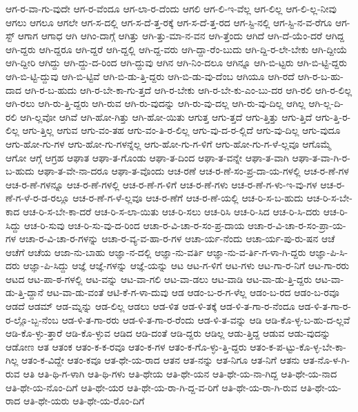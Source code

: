 {ಆಗ-ರ-ವಾ-ಗು-ವುದೇ
ಆಗ-ರ-ವೆಂದೂ
ಆಗ-ಲಾ-ರ-ದೆಂದು
ಆಗಲಿ
ಆಗ-ಲಿ-ಇ-ವೆಲ್ಲ
ಆಗ-ಲಿಲ್ಲ
ಆಗ-ಲಿ-ಲ್ಲ-ನೀವು
ಆಗಲು
ಆಗಲೂ
ಆಗಲೇ
ಆಗ-ಸ-ದಲ್ಲಿ
ಆಗ-ಸ-ದೆ-ತ್ತ-ರಕ್ಕೆ
ಆಗ-ಸ-ದೆ-ತ್ತ-ರದ
ಆಗ-ಸ್ಟಿ-ನಲ್ಲಿ
ಆಗ-ಸ್ಟಿ-ನ-ವ-ರೆಗೂ
ಆಗ-ಸ್ಟ್
ಆಗಾಗ
ಆಗಾಧ
ಆಗಿ
ಆಗಿಂ-ದಾಗ್ಗೆ
ಆಗಿತ್ತು
ಆಗಿ-ತ್ತು-ಮಾ-ನ-ವನ
ಆಗಿ-ತ್ತೆಂದು
ಆಗಿದೆ
ಆಗಿ-ದೆ-ಯೆಂ-ದರೆ
ಆಗಿದ್ದ
ಆಗಿ-ದ್ದರು
ಆಗಿ-ದ್ದರೂ
ಆಗಿ-ದ್ದರೆ
ಆಗಿ-ದ್ದಲ್ಲಿ
ಆಗಿ-ದ್ದ-ವರು
ಆಗಿ-ದ್ದಾ-ರೆಂ-ಬುದು
ಆಗಿ-ದ್ದಿ-ರ-ಲೇ-ಬೇಕು
ಆಗಿ-ದ್ದೀಯೆ
ಆಗಿ-ದ್ದೀರಿ
ಆಗಿದ್ದು
ಆಗಿ-ದ್ದು-ದ-ರಿಂದ
ಆಗಿ-ದ್ದುವು
ಆಗಿನ
ಆಗಿ-ನಿಂ-ದಲೂ
ಆಗಿನ್ನೂ
ಆಗಿ-ಬಿ-ಟ್ಟರು
ಆಗಿ-ಬಿ-ಟ್ಟಿ-ದ್ದರು
ಆಗಿ-ಬಿ-ಟ್ಟಿ-ದ್ದುವು
ಆಗಿ-ಬಿ-ಟ್ಟಿವೆ
ಆಗಿ-ಬಿ-ಡು-ತ್ತಿ-ದ್ದರು
ಆಗಿ-ಬಿ-ಡು-ವು-ದೆಂಬ
ಆಗಿಯೂ
ಆಗಿ-ರದೆ
ಆಗಿ-ರ-ಬ-ಹು-ದಾದ
ಆಗಿ-ರ-ಬ-ಹುದು
ಆಗಿ-ರ-ಬೇ-ಕಾ-ಗು-ತ್ತದೆ
ಆಗಿ-ರ-ಬೇಕು
ಆಗಿ-ರ-ಬೇ-ಕು-ಎಂ-ಬು-ದರ
ಆಗಿ-ರಲಿ
ಆಗಿ-ರ-ಲಿಲ್ಲ
ಆಗಿ-ರಲು
ಆಗಿ-ರು-ತ್ತಿ-ದ್ದರು
ಆಗಿ-ರುವ
ಆಗಿ-ರು-ವುದನ್ನು
ಆಗಿ-ರು-ವು-ದಲ್ಲ
ಆಗಿ-ರು-ವು-ದಿಲ್ಲ
ಆಗಿಲ್ಲ
ಆಗಿ-ಲ್ಲ-ದಿ-ರಲಿ
ಆಗಿ-ಲ್ಲವೋ
ಆಗಿವೆ
ಆಗಿ-ಹೋ-ಗಿತ್ತು
ಆಗಿ-ಹೋ-ಯಿತು
ಆಗುತ್ತ
ಆಗು-ತ್ತದೆ
ಆಗು-ತ್ತಿತ್ತು
ಆಗು-ತ್ತಿದೆ
ಆಗು-ತ್ತಿ-ರ-ಲಿಲ್ಲ
ಆಗು-ತ್ತಿಲ್ಲ
ಆಗುವ
ಆಗು-ವಂ-ತಹ
ಆಗು-ವಂ-ತಿ-ರ-ಲಿಲ್ಲ
ಆಗು-ವು-ದ-ರ-ಲ್ಲಿದೆ
ಆಗು-ವು-ದಿಲ್ಲ
ಆಗು-ವುದೂ
ಆಗು-ಹೋ-ಗು-ಗಳ
ಆಗು-ಹೋ-ಗು-ಗಳನ್ನೆಲ್ಲ
ಆಗು-ಹೋ-ಗು-ಗ-ಳಿಗೆ
ಆಗು-ಹೋ-ಗು-ಗ-ಳೆ-ಲ್ಲವೂ
ಆಗೊಮ್ಮೆ
ಆಗೋ
ಆಗ್ಗೆ
ಆಗ್ರಹ
ಆಘಾತ
ಆಘಾ-ತ-ಗೊಂಡು
ಆಘಾ-ತ-ದಿಂದ
ಆಘಾ-ತ-ವನ್ನೇ
ಆಘಾ-ತ-ವಾಗಿ
ಆಘಾ-ತ-ವಾ-ಗಿ-ರ-ಬ-ಹುದು
ಆಘಾ-ತ-ವೇ-ನಾ-ದರೂ
ಆಘಾ-ತ-ವೊಂದು
ಆಚ-ರಣೆ
ಆಚ-ರ-ಣೆ-ಸಂ-ಪ್ರ-ದಾ-ಯ-ಗಳಲ್ಲಿ
ಆಚ-ರ-ಣೆ-ಗಳ
ಆಚ-ರ-ಣೆ-ಗಳನ್ನೂ
ಆಚ-ರ-ಣೆ-ಗಳಲ್ಲಿ
ಆಚ-ರ-ಣೆ-ಗ-ಳಿಗೆ
ಆಚ-ರ-ಣೆ-ಗಳು
ಆಚ-ರ-ಣೆ-ಗ-ಳು-ಇ-ವು-ಗಳ
ಆಚ-ರ-ಣೆ-ಗ-ಳೆ-ರ-ಡ-ರಲ್ಲೂ
ಆಚ-ರ-ಣೆ-ಗ-ಳೆ-ಲ್ಲವೂ
ಆಚ-ರ-ಣೆಗೆ
ಆಚ-ರ-ಣೆ-ಯಲ್ಲಿ
ಆಚ-ರಿ-ಸ-ಬ-ಹುದು
ಆಚ-ರಿ-ಸ-ಬೇ-ಕಾದ
ಆಚ-ರಿ-ಸ-ಬೇ-ಕಾ-ದರೆ
ಆಚ-ರಿ-ಸ-ಲಾ-ಯಿತು
ಆಚ-ರಿ-ಸಲು
ಆಚ-ರಿಸಿ
ಆಚ-ರಿ-ಸಿದ
ಆಚ-ರಿ-ಸಿ-ದರು
ಆಚ-ರಿ-ಸಿದ್ದು
ಆಚ-ರಿ-ಸುವು
ಆಚ-ರಿ-ಸು-ವು-ದ-ರಿಂದ
ಆಚಾ-ರ-ವಿ-ಚಾ-ರ-ಸಂ-ಪ್ರ-ದಾಯ
ಆಚಾ-ರ-ವಿ-ಚಾ-ರ-ಸಂ-ಪ್ರಾ-ಯ-ಗಳ
ಆಚಾ-ರ-ವಿ-ಚಾ-ರ-ಗಳನ್ನು
ಆಚಾ-ರ-ವ್ಯ-ವ-ಹಾ-ರ-ಗಳ
ಆಚಾ-ರ್ಯ-ನೆಂದು
ಆಚಾ-ರ್ಯ-ಪು-ರು-ಷನ
ಆಚೆ
ಆಚೆಗೆ
ಆಚೆಯ
ಆಜಾ-ನು-ಬಾಹು
ಆಜ್ಞಾ-ನ-ದಲ್ಲಿ
ಆಜ್ಞಾ-ನು-ವರ್ತಿ
ಆಜ್ಞಾ-ನು-ವ-ರ್ತಿ-ಗ-ಳಾ-ಗಿ-ದ್ದರು
ಆಜ್ಞಾ-ಪಿ-ಸಿ-ದರು
ಆಜ್ಞಾ-ಪಿ-ಸಿದ್ದು
ಆಜ್ಞೆ
ಆಜ್ಞೆ-ಗಳನ್ನು
ಆಜ್ಞೆ-ಯನ್ನು
ಆಟ
ಆಟ-ಗ-ಳಿಗೆ
ಆಟ-ಗಳು
ಆಟ-ಗಾ-ರ-ನಿಗೆ
ಆಟ-ಗಾ-ರರು
ಆಟದ
ಆಟ-ಪಾ-ಠ-ಗಳಲ್ಲಿ
ಆಟ-ವನ್ನು
ಆಟ-ವಾ-ಗಲಿ
ಆಟ-ವಾ-ಡಲು
ಆಟ-ವಾಡಿ
ಆಟ-ವಾ-ಡು-ತ್ತಿ-ದ್ದರು
ಆಟ-ವಾ-ಡು-ತ್ತಿ-ದ್ದಾನೆ
ಆಟ-ವಾ-ಡು-ವಂತೆ
ಆಟಿ-ಕೆ-ಗ-ಳಾ-ದುವು
ಆಡ
ಆಡಂ-ಬ-ರ-ಗ-ಳೆಲ್ಲ
ಆಡಂ-ಬ-ರದ
ಆಡಂ-ಬ-ರವೂ
ಆಡದೆ
ಆಡಮ್
ಆಡ-ಮ್ನನ್ನು
ಆಡ-ಲಿಲ್ಲ
ಆಡಲು
ಆಡ-ಳಿತ
ಆಡ-ಳಿ-ತಕ್ಕೆ
ಆಡ-ಳಿ-ತ-ಗಾ-ರ-ನೆಂದೂ
ಆಡ-ಳಿ-ತ-ಗಾ-ರ-ರ-ಲ್ಲೊ-ಬ್ಬ-ನೆಂಬ
ಆಡ-ಳಿ-ತ-ಗಾ-ರರು
ಆಡ-ಳಿ-ತ-ಗಾ-ರ-ರೆಂದು
ಆಡ-ಳಿ-ತ-ವನ್ನು
ಆಡಿ
ಆಡಿ-ಕೊ-ಳ್ಳ-ಬ-ಹು-ದ-ಲ್ಲವೆ
ಆಡಿ-ಕೊ-ಳ್ಳು-ತ್ತಾರೆ
ಆಡಿ-ಕೊ-ಳ್ಳುವ
ಆಡಿದ
ಆಡಿ-ದಂತೆ
ಆಡಿ-ದ್ದರು
ಆಡಿಲ್ಲ
ಆಡು-ತ್ತಿದ್ದ
ಆಡುವ
ಆಡು-ವುದನ್ನು
ಆಡೋಣ
ಆತ
ಆತಂಕ
ಆತಂ-ಕ-ಕ-ರವೂ
ಆತಂ-ಕ-ಗಳ
ಆತಂ-ಕ-ಗೊ-ಳ್ಳು-ತ್ತಿ-ದ್ದರು
ಆತಂ-ಕ-ಪ-ಟ್ಟು-ಕೊ-ಳ್ಳ-ಬೇ-ಕಾ-ಗಿಲ್ಲ
ಆತಂ-ಕ-ವಿದ್ದೇ
ಆತಂ-ಕವೂ
ಆತ-ಥೇ-ಯ-ರಾದ
ಆತನ
ಆತ-ನನ್ನು
ಆತ-ನಿಗೂ
ಆತ-ನಿಗೆ
ಆತನು
ಆತ-ನೊ-ಳ-ಗಿ-ರುವ
ಆತಿ
ಆತಿ-ಥಿ-ಗ-ಳಾಗಿ
ಆತಿ-ಥಿ-ಗಳು
ಆತಿ-ಥೇಯ
ಆತಿ-ಥೇ-ಯನ
ಆತಿ-ಥೇ-ಯ-ನಾ-ಗಿದ್ದ
ಆತಿ-ಥೇ-ಯ-ನಾದ
ಆತಿ-ಥೇ-ಯ-ನೊಂ-ದಿಗೆ
ಆತಿ-ಥೇ-ಯರ
ಆತಿ-ಥೇ-ಯ-ರಾ-ಗಿ-ದ್ದ-ವ-ರಿಗೆ
ಆತಿ-ಥೇ-ಯ-ರಾ-ಗಿ-ರುವ
ಆತಿ-ಥೇ-ಯ-ರಾದ
ಆತಿ-ಥೇ-ಯರು
ಆತಿ-ಥೇ-ಯ-ರೊಂ-ದಿಗೆ
}

